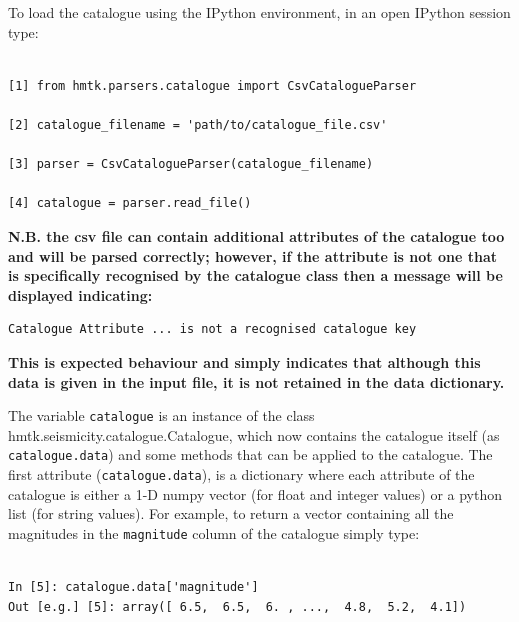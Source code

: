 To load the catalogue using the IPython environment, in an open IPython session type:

\begin{Verbatim}[frame=single, commandchars=\\\{\}, fontsize=\scriptsize, samepage=true]

[1] from hmtk.parsers.catalogue import CsvCatalogueParser

[2] catalogue_filename = 'path/to/catalogue_file.csv'

[3] parser = CsvCatalogueParser(catalogue_filename)

[4] catalogue = parser.read_file()

\end{Verbatim}

\textbf{N.B. the csv file can contain additional attributes of the catalogue too and will be parsed correctly; however, if the attribute is not one that is specifically recognised by the catalogue class then a message will be displayed indicating:}

\begin{Verbatim}[frame=single, commandchars=\\\{\}, fontsize=\scriptsize, samepage=true]
Catalogue Attribute ... is not a recognised catalogue key 
\end{Verbatim}

\textbf{This is expected behaviour and simply indicates that although this data is given in the input file, it is not retained in the data dictionary.}


The variable \verb=catalogue= is an instance of the class hmtk.seismicity.catalogue.Catalogue, which now contains the catalogue itself (as \verb=catalogue.data=) and some methods that can be applied to the catalogue. The first attribute (\verb=catalogue.data=), is a dictionary where each attribute of the catalogue is either a 1-D numpy vector (for float and integer values) or a python list (for string values). For example, to return a vector containing all the magnitudes in the \verb=magnitude= column of the catalogue simply type:

\begin{Verbatim}[frame=single, commandchars=\\\{\}, fontsize=\scriptsize, samepage=true]

In [5]: catalogue.data['magnitude']
Out [e.g.] [5]: array([ 6.5,  6.5,  6. , ...,  4.8,  5.2,  4.1])

\end{Verbatim}

